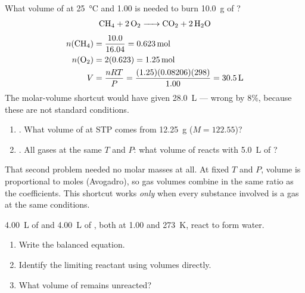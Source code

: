 \documentclass{apchem-notes}
\begin{document}
\begin{workedexample}
What volume of  at \SI{25}{\celsius} and \SI{1.00}{\atm} is needed to
burn \SI{10.0}{\gram} of ?
\[ \ce{CH4 + 2 O2 -> CO2 + 2 H2O} \]
\begin{align*}
  n(\ce{CH4}) &= \frac{10.0}{16.04} = \SI{0.623}{\mole}\\
  n(\ce{O2}) &= 2(0.623) = \SI{1.25}{\mole}\\
  V &= \frac{nRT}{P} = \frac{(1.25)(0.08206)(298)}{1.00} = \SI{30.5}{\liter}
\end{align*}
The molar-volume shortcut would have given \SI{28.0}{\liter} --- wrong by
8\%, because these are not standard conditions.
\end{workedexample}


\begin{enumerate}[leftmargin=*,itemsep=0.4em]
  \item {}. What volume of  at
        STP comes from \SI{12.25}{\gram}  ($M = 122.55$)?
        \workspace[2.2cm]
  \item {}. All gases at the same $T$ and
        $P$: what volume of  reacts with \SI{5.0}{\liter} of
        ? 
\end{enumerate}

\begin{apcnote}
That second problem needed no molar masses at all. At fixed $T$ and $P$,
volume is proportional to moles (Avogadro), so gas volumes combine in the
same ratio as the coefficients. This shortcut works \emph{only} when every
substance involved is a gas at the same conditions.
\end{apcnote}


\SI{4.00}{\liter} of  and \SI{4.00}{\liter} of , both at
\SI{1.00}{\atm} and \SI{273}{\kelvin}, react to form water.

\begin{enumerate}[leftmargin=*,itemsep=0.4em]
  \item Write the balanced equation.
  \item Identify the limiting reactant using volumes directly.
  \item What volume of  remains unreacted?
\end{enumerate}
\end{document}
